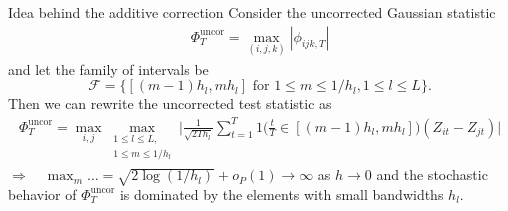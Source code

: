 \documentclass[10pt, handout]{beamer}
\begin{document}
\begin{frame}{Idea behind the additive correction}
Consider the uncorrected Gaussian statistic
\begin{align*}
\Phi_{T}^{\text{uncor}} = \max_{(i,j,k)} |\phi_{ijk, T}|
\end{align*}\pause
and let the family of intervals be \[\mathcal{F} = \big\{[(m-1) h_l, m h_l] \text{ for } 1\le m \le 1/h_l, 1 \le l \le L\big\}.\]\pause
Then we can rewrite the uncorrected test statistic as
\begin{align*}
\Phi_{T}^{\text{uncor}} = \max_{i, j} \max_{\substack{1 \le l \le L, \\ 1\le m \le 1/h_l}} \Big|\frac{1}{\sqrt{2 T h_l}} \sum\limits_{t=1}^T 1 \Big( \frac{t}{T} \in [(m-1) h_l, m h_l] \Big) (Z_{it} - Z_{jt})\Big|
\end{align*}\pause
$\Rightarrow \quad \max_m \ldots =\sqrt{2\log(1/h_l)} + o_P(1) \to \infty$ as $h \to 0$ and the stochastic behavior of $\Phi_{T}^{\text{uncor}}$ is dominated by the elements with small bandwidths $h_l$. \hyperlink{frame_test<4>}{}
\end{frame}
\end{document}
